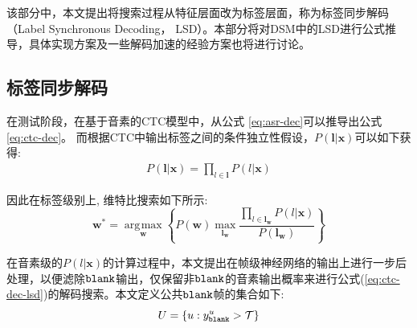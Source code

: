 该部分中，本文提出将搜索过程从特征层面改为标签层面，称为标签同步解码（Label Synchronous Decoding， LSD）。本部分将对DSM中的LSD进行公式推导，具体实现方案及一些解码加速的经验方案也将进行讨论。

\subsection{标签同步解码}
\label{chap:lsd-lsd-ctc-method}
在测试阶段，在基于音素的CTC模型中，从公式 \ref{eq:asr-dec}可以推导出公式\ref{eq:ctc-dec}。 而根据CTC中输出标签之间的条件独立性假设，$P(\mathbf{l}|\mathbf{x})$可以如下获得:
\begin{equation} \label{eq:indep-output-ctc}
  \begin{split}
        P(\mathbf{l}|\mathbf{x}) 
        = \prod_{l\in\mathbf{l}} P(l|\mathbf{x}) \end{split}
       \end{equation}

因此在标签级别上, 维特比搜索如下所示:
\begin{equation} \label{eq:ctc-dec-lsd}
   \mathbf{w}^* = \mathop{\arg\!\max}\limits_\mathbf{w} \left\{
        P(\mathbf{w})
        \mathop{\max}\limits_{\mathbf{l}_\mathbf{w}} \frac{ \prod_{l\in\mathbf{l}_\mathbf{w}} P(l|\mathbf{x}) }{P(\mathbf{l}_\mathbf{w})}\right\}
     \end{equation}

在音素级的$P(l|\mathbf{x})$的计算过程中，本文提出在帧级神经网络的输出上进行一步后处理，以便滤除$\tt blank$输出，仅保留非$\tt blank$的音素输出概率来进行公式(\ref{eq:ctc-dec-lsd})的解码搜索。本文定义公共$\tt blank$帧的集合如下:
  \begin{equation} \label{eq:com-blk-idx}
    U=\{u:y^{u}_{\tt{blank}} > \mathcal{T}\}
    \end{equation}


